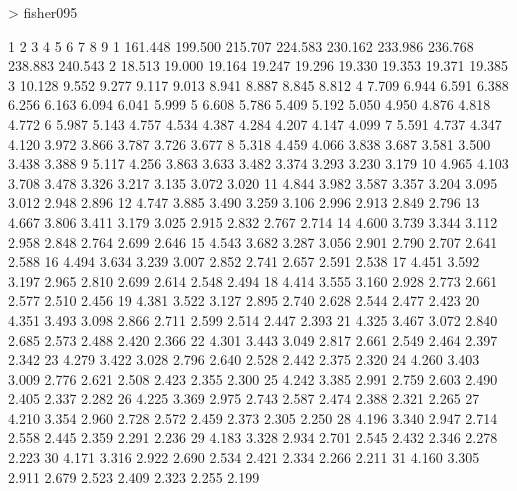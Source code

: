 \documentclass[onecolumn,12pt]{book}
\begin{document}
\begin{Schunk}
\begin{Sinput}
> fisher095
\end{Sinput}
\begin{Soutput}
          1       2       3       4       5       6       7       8       9
1   161.448 199.500 215.707 224.583 230.162 233.986 236.768 238.883 240.543
2    18.513  19.000  19.164  19.247  19.296  19.330  19.353  19.371  19.385
3    10.128   9.552   9.277   9.117   9.013   8.941   8.887   8.845   8.812
4     7.709   6.944   6.591   6.388   6.256   6.163   6.094   6.041   5.999
5     6.608   5.786   5.409   5.192   5.050   4.950   4.876   4.818   4.772
6     5.987   5.143   4.757   4.534   4.387   4.284   4.207   4.147   4.099
7     5.591   4.737   4.347   4.120   3.972   3.866   3.787   3.726   3.677
8     5.318   4.459   4.066   3.838   3.687   3.581   3.500   3.438   3.388
9     5.117   4.256   3.863   3.633   3.482   3.374   3.293   3.230   3.179
10    4.965   4.103   3.708   3.478   3.326   3.217   3.135   3.072   3.020
11    4.844   3.982   3.587   3.357   3.204   3.095   3.012   2.948   2.896
12    4.747   3.885   3.490   3.259   3.106   2.996   2.913   2.849   2.796
13    4.667   3.806   3.411   3.179   3.025   2.915   2.832   2.767   2.714
14    4.600   3.739   3.344   3.112   2.958   2.848   2.764   2.699   2.646
15    4.543   3.682   3.287   3.056   2.901   2.790   2.707   2.641   2.588
16    4.494   3.634   3.239   3.007   2.852   2.741   2.657   2.591   2.538
17    4.451   3.592   3.197   2.965   2.810   2.699   2.614   2.548   2.494
18    4.414   3.555   3.160   2.928   2.773   2.661   2.577   2.510   2.456
19    4.381   3.522   3.127   2.895   2.740   2.628   2.544   2.477   2.423
20    4.351   3.493   3.098   2.866   2.711   2.599   2.514   2.447   2.393
21    4.325   3.467   3.072   2.840   2.685   2.573   2.488   2.420   2.366
22    4.301   3.443   3.049   2.817   2.661   2.549   2.464   2.397   2.342
23    4.279   3.422   3.028   2.796   2.640   2.528   2.442   2.375   2.320
24    4.260   3.403   3.009   2.776   2.621   2.508   2.423   2.355   2.300
25    4.242   3.385   2.991   2.759   2.603   2.490   2.405   2.337   2.282
26    4.225   3.369   2.975   2.743   2.587   2.474   2.388   2.321   2.265
27    4.210   3.354   2.960   2.728   2.572   2.459   2.373   2.305   2.250
28    4.196   3.340   2.947   2.714   2.558   2.445   2.359   2.291   2.236
29    4.183   3.328   2.934   2.701   2.545   2.432   2.346   2.278   2.223
30    4.171   3.316   2.922   2.690   2.534   2.421   2.334   2.266   2.211
31    4.160   3.305   2.911   2.679   2.523   2.409   2.323   2.255   2.199

\end{Soutput}
\end{Schunk}
\end{document}
